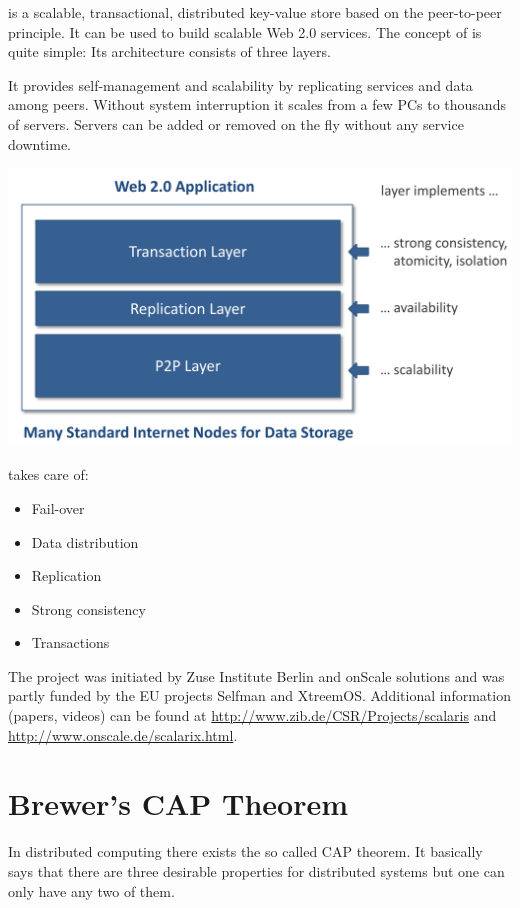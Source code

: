 \documentclass[a4paper]{scrreprt}
\begin{document}
\scalaris{} is a scalable, transactional, distributed key-value store based on
the peer-to-peer principle. It can be used to build scalable Web 2.0
services. The concept of \scalaris{} is quite simple: Its architecture consists
of three layers.

It provides self-management and scalability by replicating services and data
among peers. Without system interruption it scales from a few PCs to
thousands of servers. Servers can be added or removed on the fly without any
service downtime.

\begin{center}
\includegraphics[width=0.7\linewidth]{layers}
\end{center}

\scalaris{} takes care of:

\begin{itemize}
\item Fail-over
\item Data distribution
\item Replication
\item Strong consistency
\item Transactions
\end{itemize}

The \scalaris{} project was initiated by Zuse Institute Berlin and onScale
solutions and was partly funded by the EU projects Selfman and
XtreemOS. Additional information (papers, videos) can be found at
\url{http://www.zib.de/CSR/Projects/scalaris} and
\url{http://www.onscale.de/scalarix.html}.

\section{Brewer's CAP Theorem}

In distributed computing there exists the so called CAP theorem. It
basically says that there are three desirable properties for distributed
systems but one can only have any two of them.
\end{document}
